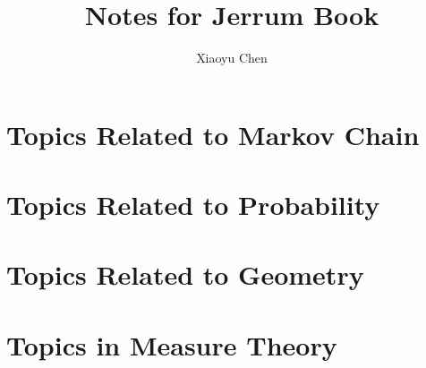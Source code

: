 \documentclass{tufte-book}
\title{\Huge Notes for Jerrum Book}
\author{Xiaoyu Chen}
\begin{document}
\maketitle
\tableofcontents
\clearpage

\chapter{Topics Related to Markov Chain}
\clearpage













\chapter{Topics Related to Probability}
\clearpage













\chapter{Topics Related to Geometry}
\clearpage







\chapter{Topics in Measure Theory}
\clearpage



\printindex
\end{document}

